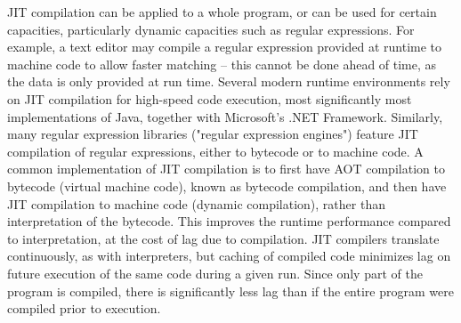 JIT compilation can be applied to a whole program, or can be used for certain capacities, particularly dynamic capacities such as regular expressions. For example, a text editor may compile a regular expression provided at runtime to machine code to allow faster matching – this cannot be done ahead of time, as the data is only provided at run time. Several modern runtime environments rely on JIT compilation for high-speed code execution, most significantly most implementations of Java, together with Microsoft's .NET Framework. Similarly, many regular expression libraries ("regular expression engines") feature JIT compilation of regular expressions, either to bytecode or to machine code.
A common implementation of JIT compilation is to first have AOT compilation to bytecode (virtual machine code), known as bytecode compilation, and then have JIT compilation to machine code (dynamic compilation), rather than interpretation of the bytecode. This improves the runtime performance compared to interpretation, at the cost of lag due to compilation. JIT compilers translate continuously, as with interpreters, but caching of compiled code minimizes lag on future execution of the same code during a given run. Since only part of the program is compiled, there is significantly less lag than if the entire program were compiled prior to execution.

